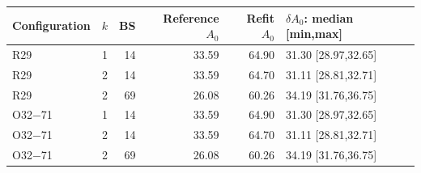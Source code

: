 \begin{center}\begin{minipage}{\textwidth}\centering\small
{}\label{tab:sintercepts}
\begin{tabular}{lrrrrl}
\toprule Configuration & $k$ & BS & Reference $A_0$ & Refit $A_0$ & $\delta A_0$: median [min,max]\\\midrule
R29 & 1 & 14 & 33.59 & 64.90 & 31.30 [28.97,32.65]\\
R29 & 2 & 14 & 33.59 & 64.70 & 31.11 [28.81,32.71]\\
R29 & 2 & 69 & 26.08 & 60.26 & 34.19 [31.76,36.75]\\
O32$-$71 & 1 & 14 & 33.59 & 64.90 & 31.30 [28.97,32.65]\\
O32$-$71 & 2 & 14 & 33.59 & 64.70 & 31.11 [28.81,32.71]\\
O32$-$71 & 2 & 69 & 26.08 & 60.26 & 34.19 [31.76,36.75]\\
\bottomrule
\end{tabular}
\end{minipage}\end{center}
